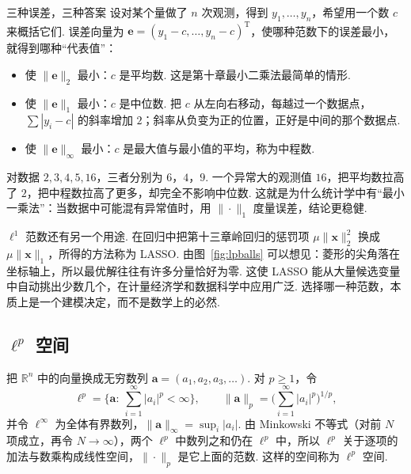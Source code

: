 \documentclass[lang=cn,10.5pt,scheme=chinese,toc=twocol,section,chinesefont=nofont,
twoside,citestyle=gb7714-2015,bibstyle=gb7714-2015]{elegantbook}
\DeclareRobustCommand{\textbf}[1]{{\lnsemiboldlatin\lnsemiboldcjk #1}}
\newcommand{\vv}[1]{\boldsymbol{#1}}
\newcommand{\trans}{\mathrm{T}}             %
\numberwithin{equation}{section}   %
\begin{document}
\begin{linkbox}{三种误差，三种答案}
  设对某个量做了 $n$ 次观测，得到 $y_1,\ldots,y_n$，希望用一个数 $c$ 来概括它们. 误差向量为 $\vv e=(y_1-c,\ldots,y_n-c)^\trans$，使哪种范数下的误差最小，就得到哪种“代表值”：
  \begin{itemize}
    \item 使 $\|\vv e\|_2$ 最小：$c$ 是\textbf{平均数}. 这是第十章最小二乘法最简单的情形.
    \item 使 $\|\vv e\|_1$ 最小：$c$ 是\textbf{中位数}. 把 $c$ 从左向右移动，每越过一个数据点，$\sum|y_i-c|$ 的斜率增加 $2$；斜率从负变为正的位置，正好是中间的那个数据点.
    \item 使 $\|\vv e\|_\infty$ 最小：$c$ 是最大值与最小值的平均，称为\textbf{中程数}.
  \end{itemize}
  对数据 $2,3,4,5,16$，三者分别为 $6$，$4$，$9$. 一个异常大的观测值 $16$，把平均数拉高了 $2$，把中程数拉高了更多，却完全不影响中位数. 这就是为什么统计学中有“最小一乘法”：当数据中可能混有异常值时，用 $\|\cdot\|_1$ 度量误差，结论更稳健.

  $\ell^1$ 范数还有另一个用途. 在回归中把第十三章岭回归的惩罚项 $\mu\|\vv x\|_2^2$ 换成 $\mu\|\vv x\|_1$，所得的方法称为 LASSO. 由图~\ref{fig:lpballs} 可以想见：菱形的尖角落在坐标轴上，所以最优解往往有许多分量恰好为零. 这使 LASSO 能从大量候选变量中自动挑出少数几个，在计量经济学和数据科学中应用广泛. 选择哪一种范数，本质上是一个建模决定，而不是数学上的必然.
\end{linkbox}

\subsection{\texorpdfstring{$\ell^p$}{lp} 空间}

把 $\mathbb{R}^n$ 中的向量换成无穷数列 $\vv a=(a_1,a_2,a_3,\ldots)$. 对 $p\ge1$，令
\[
  \ell^p=\Big\{\vv a:\ \sum_{i=1}^\infty|a_i|^p<\infty\Big\},\qquad \|\vv a\|_p=\Big(\sum_{i=1}^\infty|a_i|^p\Big)^{1/p},
\]
并令 $\ell^\infty$ 为全体有界数列，$\|\vv a\|_\infty=\sup_i|a_i|$. 由 Minkowski 不等式（对前 $N$ 项成立，再令 $N\to\infty$），两个 $\ell^p$ 中数列之和仍在 $\ell^p$ 中，所以 $\ell^p$ 关于逐项的加法与数乘构成线性空间，$\|\cdot\|_p$ 是它上面的范数. 这样的空间称为 \textbf{$\ell^p$ 空间}.
\end{document}
